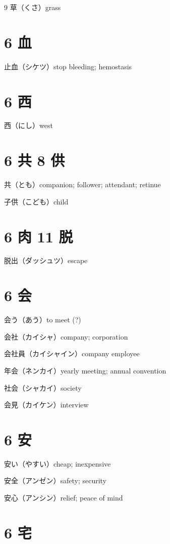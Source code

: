 9 草（くさ）grass

\section{6 血}

止血（シケツ）stop bleeding; hemostasis

\section{6 西}

西（にし）west

\section{6 共 8 供}

共（とも）companion; follower; attendant; retinue

子供（こども）child

\section{6 肉 11 脱}

脱出（ダッシュツ）escape

\section{6 会}

会う（あう）to meet (?)

会社（カイシャ）company; corporation

会社員（カイシャイン）company employee

年会（ネンカイ）yearly meeting; annual convention

社会（シャカイ）society

会見（カイケン）interview

\section{6 安}

安い（やすい）cheap; inexpensive

安全（アンゼン）safety; security

安心（アンシン）relief; peace of mind

\section{6 宅}

